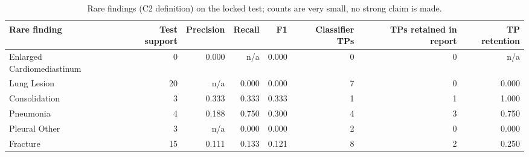\begin{table}[t]
\centering
\scriptsize
\begin{tabular}{lrrrrrrr}
\hline
Rare finding & Test support & Precision & Recall & F1 & Classifier TPs & TPs retained in report & TP retention \\
\hline
Enlarged Cardiomediastinum & 0 & 0.000 & n/a & 0.000 & 0 & 0 & n/a \\
Lung Lesion & 20 & n/a & 0.000 & 0.000 & 7 & 0 & 0.000 \\
Consolidation & 3 & 0.333 & 0.333 & 0.333 & 1 & 1 & 1.000 \\
Pneumonia & 4 & 0.188 & 0.750 & 0.300 & 4 & 3 & 0.750 \\
Pleural Other & 3 & n/a & 0.000 & 0.000 & 2 & 0 & 0.000 \\
Fracture & 15 & 0.111 & 0.133 & 0.121 & 8 & 2 & 0.250 \\
\hline
\end{tabular}
\caption{Rare findings (C2 definition) on the locked test; counts are very small, no strong claim is made.}
\label{tab:table7_rare_finding_analysis}
\end{table}
